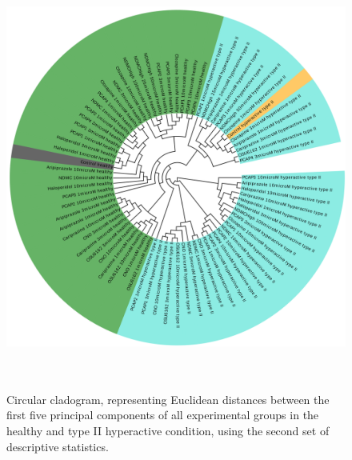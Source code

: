 \documentclass[a4paper,12pt]{article}
\begin{document}
\begin{figure}[h!]
\begin{center}
\includegraphics[width=14cm,height=14cm]{DarkPTZ_set2_PCA_tree_A.png}
\caption{Circular cladogram, representing Euclidean distances between the first five principal components of all experimental groups in the healthy and type II hyperactive condition, using the second set of descriptive statistics.}
\end{center}
\end{figure}
\newpage
\end{document}
